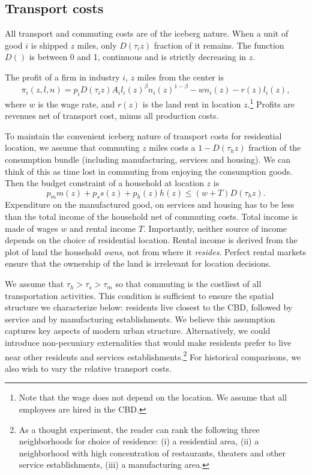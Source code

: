 \documentclass[12pt]{article}
\begin{document}
\subsection{Transport costs}
All transport and commuting costs are of the iceberg nature. When a unit of good $i$ is shipped $z$ miles, only $D(\tau_i z)$ fraction of it remains. The function $D()$ is between 0 and 1, continuous and is strictly decreasing in $z$.

The profit of a firm in industry $i$, $z$ miles from the center is
\[
\pi_i(z,l,n) = p_iD(\tau_i z)A_il_i(z)^\beta n_i(z)^{1-\beta} - wn_i(z) - r(z)l_i(z),
\]
where $w$ is the wage rate, and $r(z)$ is the land rent in location $z$.\footnote{Note that the wage does not depend on the location. We assume that all employees are hired in the CBD.} Profits are revenues net of transport cost, minus all production costs.

To maintain the convenient iceberg nature of transport costs for residential location, we assume that commuting $z$ miles costs a $1-D(\tau_h z)$ fraction of the consumption bundle (including manufacturing, services and housing). We can think of this as time lost in commuting from enjoying the consumption goods. Then the budget constraint of a household at location $z$ is
\[
p_m m(z) + p_s s(z) + p_h(z) h(z) \le (w+T)D(\tau_h z).
\]
Expenditure on the manufactured good, on services and housing has to be less than the total income of the household net of commuting costs. Total income is made of wages $w$ and rental income $T$. Importantly, neither source of income depends on the choice of residential location. Rental income is derived from the plot of land the household \emph{owns}, not from where it \emph{resides}. Perfect rental markets ensure that the ownership of the land is irrelevant for location decisions.

We assume that $\tau_h>\tau_s>\tau_m$ so that commuting is the costliest of all transportation activities. This condition is sufficient to ensure the spatial structure we characterize below: residents live closest to the CBD, followed by service and by manufacturing establishments. We believe this assumption captures key aspects of modern urban structure. Alternatively, we could introduce non-pecuniary externalities that would make residents prefer to live near other residents and services establishments.\footnote{As a thought experiment, the reader can rank the following three neighborhoods for choice of residence: (i) a residential area, (ii) a neighborhood with high concentration of restaurants, theaters and other service establishments, (iii) a manufacturing area.} For historical comparisons, we also wish to vary the relative transport costs.
\end{document}
